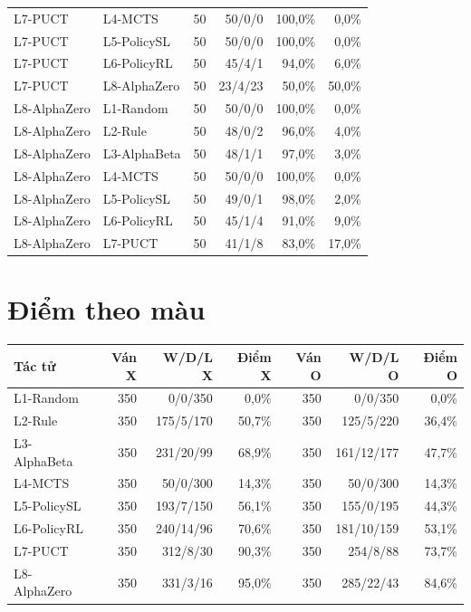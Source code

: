 \begin{small}
\begin{longtable}{@{}llrrrr@{}}
L7-PUCT & L4-MCTS & 50 & 50/0/0 & 100,0\% & 0,0\% \\
L7-PUCT & L5-PolicySL & 50 & 50/0/0 & 100,0\% & 0,0\% \\
L7-PUCT & L6-PolicyRL & 50 & 45/4/1 & 94,0\% & 6,0\% \\
L7-PUCT & L8-AlphaZero & 50 & 23/4/23 & 50,0\% & 50,0\% \\
L8-AlphaZero & L1-Random & 50 & 50/0/0 & 100,0\% & 0,0\% \\
L8-AlphaZero & L2-Rule & 50 & 48/0/2 & 96,0\% & 4,0\% \\
L8-AlphaZero & L3-AlphaBeta & 50 & 48/1/1 & 97,0\% & 3,0\% \\
L8-AlphaZero & L4-MCTS & 50 & 50/0/0 & 100,0\% & 0,0\% \\
L8-AlphaZero & L5-PolicySL & 50 & 49/0/1 & 98,0\% & 2,0\% \\
L8-AlphaZero & L6-PolicyRL & 50 & 45/1/4 & 91,0\% & 9,0\% \\
L8-AlphaZero & L7-PUCT & 50 & 41/1/8 & 83,0\% & 17,0\% \\
\bottomrule
\end{longtable}
\end{small}
\section{Điểm theo màu}
\begin{small}
\begin{longtable}{@{}lrrrrrr@{}}
\toprule
Tác tử & Ván X & W/D/L X & Điểm X & Ván O & W/D/L O & Điểm O \\
\midrule
L1-Random & 350 & 0/0/350 & 0,0\% & 350 & 0/0/350 & 0,0\% \\
L2-Rule & 350 & 175/5/170 & 50,7\% & 350 & 125/5/220 & 36,4\% \\
L3-AlphaBeta & 350 & 231/20/99 & 68,9\% & 350 & 161/12/177 & 47,7\% \\
L4-MCTS & 350 & 50/0/300 & 14,3\% & 350 & 50/0/300 & 14,3\% \\
L5-PolicySL & 350 & 193/7/150 & 56,1\% & 350 & 155/0/195 & 44,3\% \\
L6-PolicyRL & 350 & 240/14/96 & 70,6\% & 350 & 181/10/159 & 53,1\% \\
L7-PUCT & 350 & 312/8/30 & 90,3\% & 350 & 254/8/88 & 73,7\% \\
L8-AlphaZero & 350 & 331/3/16 & 95,0\% & 350 & 285/22/43 & 84,6\% \\
\bottomrule
\end{longtable}
\end{small}
